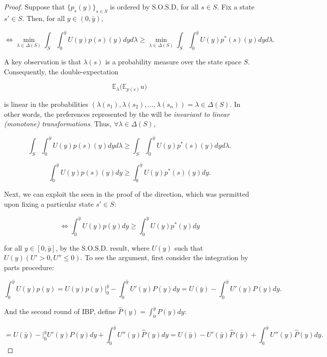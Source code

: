 \documentclass[\econtexRoot/Preproposal]{subfiles}
\begin{document}
\begin{proof}

	\par Suppose that $\{ p_s(y) \}_{s \in S}$ is ordered by S.O.S.D, for all $s \in S$. Fix a state $s' \in S$. Then, for all $y \in (0, \bar{y})$,
	
$$  \iff  \min_{\lambda \in \Delta(S)} \int_{S} \int_{0}^{\bar{y}} U(y)p(s)(y) dy d \lambda \geq  \min_{\lambda \in \Delta(S)} \int_{S} \int_{0}^{\bar{y}} U(y)p^{*}(s)(y) dy  d \lambda. $$
	
	\par A key observation is that $\lambda(s)$ is a probability measure over the state space $S$. Consequently, the double-expectation 
	
$$ \mathbb{E}_{\lambda} \bigg( \mathbb{E}_{p(s)} u \bigg) $$

	\par is linear in the probabilities $(\lambda(s_1), \lambda(s_2), \ldots, \lambda(s_n)) = \lambda \in \Delta(S)$. In other words, the preferences represented by the  will be \textit{invariant to linear (monotone) transformations}. Thus, $\forall \lambda \in \Delta(S)$,
	
$$ \int_{S} \int_{0}^{\bar{y}} U(y)p(s)(y) dy d \lambda \geq \int_{S} \int_{0}^{\bar{y}} U(y)p^*(s)(y) dy d \lambda.$$	

$$  \int_{0}^{\bar{y}} U(y)p(s)(y) dy  \geq \int_{0}^{\bar{y}} U(y)p^*(s)(y) dy .$$	
	
	\par Next, we can exploit the  seen in the proof of the \say{$\rightarrow$} direction, which was permitted upon fixing a particular state $s' \in S$:
	
$$ \iff \int_{0}^{\bar{y}} U(y)p(y) dy \geq \int_{0}^{\bar{y}} U(y)p^*(y) dy  $$	

	\par for all $y \in [0, \bar{y}]$, by the S.O.S.D. result, where $U(y)$ such that $U(y) (U' > 0, U'' \leq 0)$. To see the argument, first consider the  integration by parts procedure:
	
$$ \int_{0}^{\bar{y}} U(y)p(y) = U(y)p(y) \bigg|_{0}^{\bar{y}} - \int_{0}^{\bar{y}} U'(y) P(y) dy = U(\bar{y}) - \int_{0}^{\bar{y}} U'(y) P(y) dy .$$	
	
	\par And the second round of IBP, define $\hat{P}(y) = \int_{0}^{\bar{y}} P(y)dy$:
	
$$ = U(\bar{y}) - \bigg|_{0}^{\bar{y}} U'(y) P(y) dy + \int_{0}^{\bar{y}} U''(y) \hat{P}(y) dy = U(\bar{y}) - U'(\bar{y}) \hat{P}(\bar{y}) + \int_{0}^{\bar{y}} U''(y) \hat{P}(y) dy.$$	


\end{proof}
\end{document}
